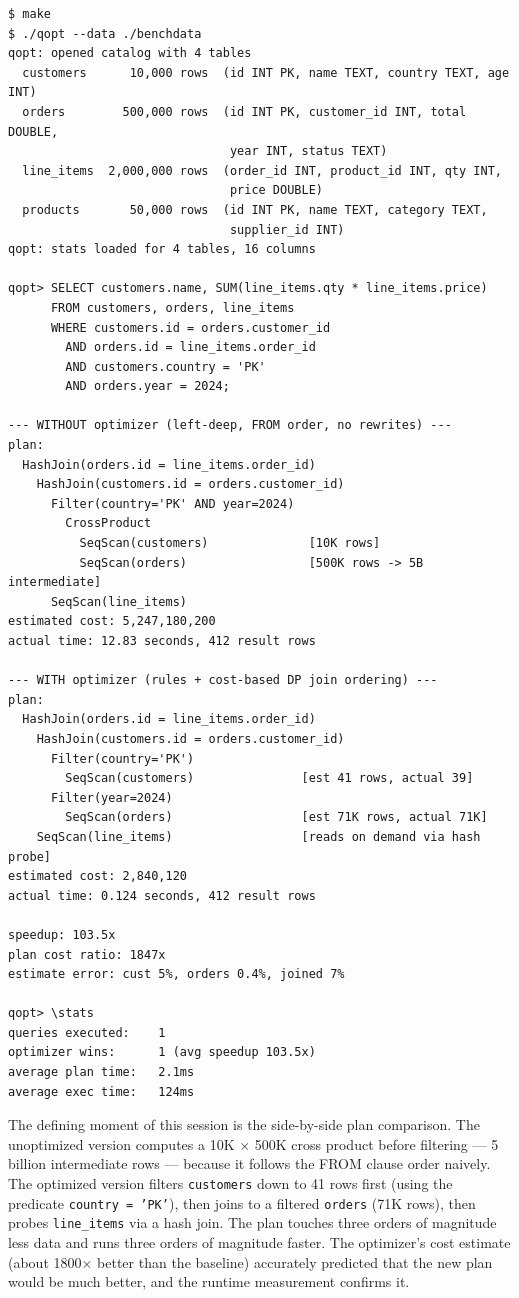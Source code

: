 \documentclass[11pt,a4paper]{article}
\begin{document}
\begin{codebox}
\begin{lstlisting}
$ make
$ ./qopt --data ./benchdata
qopt: opened catalog with 4 tables
  customers      10,000 rows  (id INT PK, name TEXT, country TEXT, age INT)
  orders        500,000 rows  (id INT PK, customer_id INT, total DOUBLE,
                               year INT, status TEXT)
  line_items  2,000,000 rows  (order_id INT, product_id INT, qty INT,
                               price DOUBLE)
  products       50,000 rows  (id INT PK, name TEXT, category TEXT,
                               supplier_id INT)
qopt: stats loaded for 4 tables, 16 columns

qopt> SELECT customers.name, SUM(line_items.qty * line_items.price)
      FROM customers, orders, line_items
      WHERE customers.id = orders.customer_id
        AND orders.id = line_items.order_id
        AND customers.country = 'PK'
        AND orders.year = 2024;

--- WITHOUT optimizer (left-deep, FROM order, no rewrites) ---
plan:
  HashJoin(orders.id = line_items.order_id)
    HashJoin(customers.id = orders.customer_id)
      Filter(country='PK' AND year=2024)
        CrossProduct
          SeqScan(customers)              [10K rows]
          SeqScan(orders)                 [500K rows -> 5B intermediate]
      SeqScan(line_items)
estimated cost: 5,247,180,200
actual time: 12.83 seconds, 412 result rows

--- WITH optimizer (rules + cost-based DP join ordering) ---
plan:
  HashJoin(orders.id = line_items.order_id)
    HashJoin(customers.id = orders.customer_id)
      Filter(country='PK')
        SeqScan(customers)               [est 41 rows, actual 39]
      Filter(year=2024)
        SeqScan(orders)                  [est 71K rows, actual 71K]
    SeqScan(line_items)                  [reads on demand via hash probe]
estimated cost: 2,840,120
actual time: 0.124 seconds, 412 result rows

speedup: 103.5x
plan cost ratio: 1847x
estimate error: cust 5%, orders 0.4%, joined 7%

qopt> \stats
queries executed:    1
optimizer wins:      1 (avg speedup 103.5x)
average plan time:   2.1ms
average exec time:   124ms
\end{lstlisting}
\end{codebox}

The defining moment of this session is the side-by-side plan comparison. The unoptimized version computes a 10K $\times$ 500K cross product before filtering --- 5 billion intermediate rows --- because it follows the FROM clause order naively. The optimized version filters \texttt{customers} down to 41 rows first (using the predicate \texttt{country = 'PK'}), then joins to a filtered \texttt{orders} (71K rows), then probes \texttt{line\_items} via a hash join. The plan touches three orders of magnitude less data and runs three orders of magnitude faster. The optimizer's cost estimate (about 1800$\times$ better than the baseline) accurately predicted that the new plan would be much better, and the runtime measurement confirms it.
\end{document}
